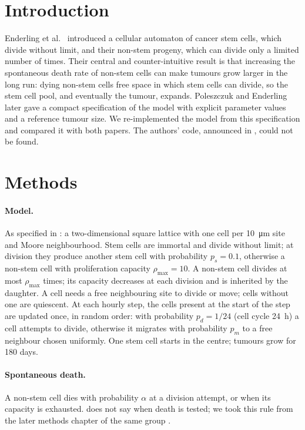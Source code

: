 
\section*{Introduction}
Enderling et al.\ \cite{enderling2009} introduced a cellular automaton of cancer stem cells,
which divide without limit, and their non-stem progeny, which can divide only a limited
number of times. Their central and counter-intuitive result is that increasing the
spontaneous death rate of non-stem cells can make tumours grow larger in the long run:
dying non-stem cells free space in which stem cells can divide, so the stem cell pool, and
eventually the tumour, expands. Poleszczuk and Enderling \cite{poleszczuk2014} later gave a
compact specification of the model with explicit parameter values and a reference tumour
size. We re-implemented the model from this specification and compared it with both papers.
The authors' code, announced in \cite{poleszczuk2014}, could not be found.

\section*{Methods}
\paragraph{Model.} As specified in \cite{poleszczuk2014}: a two-dimensional square lattice
with one cell per \SI{10}{\micro\meter} site and Moore neighbourhood. Stem cells are immortal
and divide without limit; at division they produce another stem cell with probability
$p_s=0.1$, otherwise a non-stem cell with proliferation capacity $\rho_{\max}=10$. A non-stem
cell divides at most $\rho_{\max}$ times; its capacity decreases at each division and is
inherited by the daughter. A cell needs a free neighbouring site to divide or move; cells
without one are quiescent. At each hourly step, the cells present at the start of the step
are updated once, in random order: with probability $p_d=1/24$ (cell cycle 24~h) a cell
attempts to divide, otherwise it migrates with probability $p_m$ to a free neighbour chosen
uniformly. One stem cell starts in the centre; tumours grow for 180 days.

\paragraph{Spontaneous death.} A non-stem cell dies with probability $\alpha$ at a division
attempt, or when its capacity is exhausted. \cite{poleszczuk2014} does not say when death is
tested; we took this rule from the later methods chapter of the same group
\cite{poleszczuk2016}.

